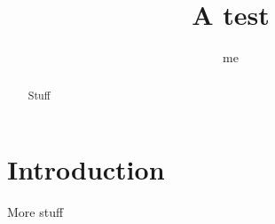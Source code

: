 \documentclass[english,11pt,a4paper]{article}
\title{A test}
\author{me}
\begin{document}
	\maketitle

\begin{abstract}
Stuff


\end{abstract}



\section{Introduction}
More stuff




 

\end{document}
